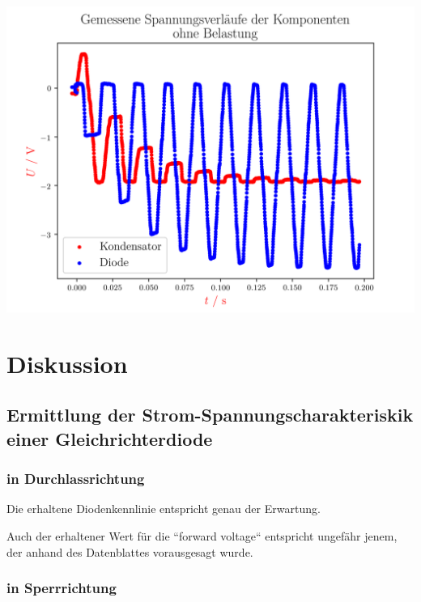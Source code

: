 \documentclass[11pt,ngerman]{scrartcl}
\begin{document}
\begin{center}
	\begin{minipage}[t]{0.8\textwidth}
		\includegraphics[width=\textwidth]{./figures/halbleiter/Versuch4/spannungbauteileohne.png}
		\label{fig:spannungbauteileohne}
	\end{minipage}
\end{center}


\section{Diskussion}\label{disk}


\subsection{Ermittlung der Strom-Spannungscharakteriskik einer Gleichrichterdiode}

\subsubsection{in Durchlassrichtung}

Die erhaltene Diodenkennlinie entspricht genau der Erwartung.

Auch der erhaltener Wert für die ``forward voltage`` entspricht ungefähr jenem,
der anhand des Datenblattes vorausgesagt wurde. \cite{1n4007}



\subsubsection{in Sperrrichtung}
\end{document}

